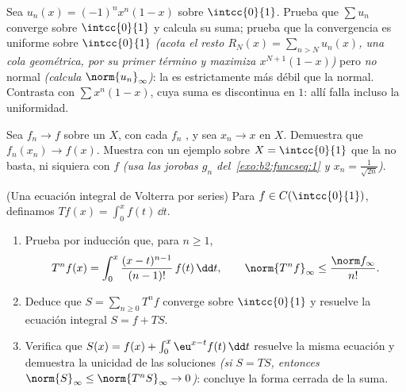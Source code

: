 \begin{exercise}[$\star$]\label{exo:b2:funcseq:10}
Sea $u_n(x) = (-1)^n x^n(1 - x)$ sobre $\intcc{0}{1}$. Prueba que
$\sum u_n$ converge  sobre $\intcc{0}{1}$ y calcula su
suma; prueba que la convergencia es uniforme sobre $\intcc{0}{1}$
\emph{(acota el resto $R_N(x) = \sum_{n > N} u_n(x)$, una cola
geométrica, por su primer término y maximiza $x^{N+1}(1-x)$)} pero
\emph{no} normal \emph{(calcula $\norm{u_n}_\infty$)}: la
 es estrictamente más débil que la
normal. Contrasta con $\sum x^n(1-x)$, cuya suma es discontinua en
$1$: allí falla incluso la uniformidad.
\end{exercise}

\begin{exercise}[$\star\star$]\label{exo:b2:funcseq:11}
Sea $f_n \to f$  sobre un  $X$, con cada
$f_n$ , y sea $x_n \to x$ en $X$. Demuestra que $f_n(x_n) \to
f(x)$. Muestra con un ejemplo sobre $X = \intcc{0}{1}$ que la
 no basta, ni siquiera con $f$ 
\emph{(usa las jorobas $g_n$ del~\cref{exo:b2:funcseq:1} y $x_n =
\frac{1}{\sqrt{2n}}$)}.
\end{exercise}

\begin{exercise}[$\star\star\star$]\label{exo:b2:funcseq:12}
(Una ecuación integral de Volterra por series) Para $f \in
C(\intcc{0}{1})$, definamos $Tf(x) = \int_0^x f(t)\,\dd t$.
\begin{enumerate}
  \item Prueba por inducción que, para $n \geq 1$,
        \[
        T^n f(x) = \int_0^x \frac{(x -
        t)^{n-1}}{(n-1)!}\,f(t)\,\dd t,
        \qquad
        \norm{T^n f}_\infty \leq \frac{\norm f_\infty}{n!} .
        \]
  \item Deduce que $S = \sum_{n\geq0} T^n f$ converge 
        sobre $\intcc{0}{1}$ y resuelve la ecuación integral $S = f
        + TS$.
  \item Verifica que $S(x) = f(x) + \int_0^x \eu^{x-t}f(t)\,\dd t$
        resuelve la misma ecuación y demuestra la unicidad de las
        soluciones  \emph{(si $S = TS$, entonces
        $\norm{S}_\infty \leq \norm{T^nS}_\infty \to 0$)}: concluye
        la forma cerrada de la suma.
\end{enumerate}
\end{exercise}

